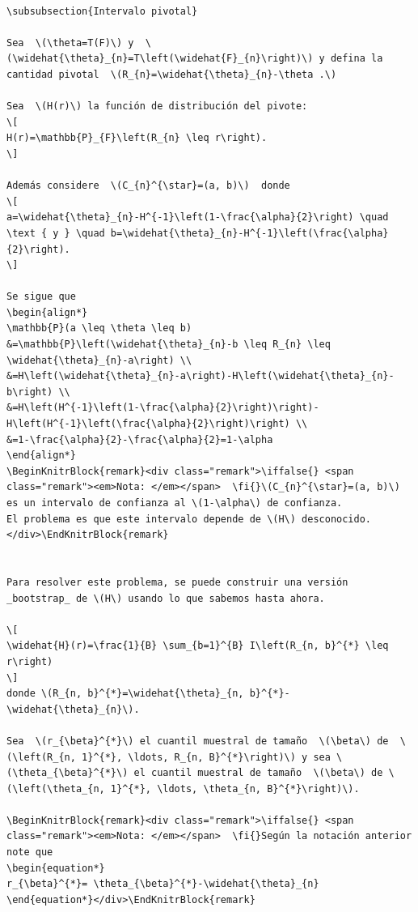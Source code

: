 \documentclass[
  12pt,
]{book}
\theoremstyle{definition}
\theoremstyle{definition}
\theoremstyle{definition}
\theoremstyle{remark}
\let\BeginKnitrBlock\begin \let\EndKnitrBlock\end
\begin{document}
\begin{verbatim}

\subsubsection{Intervalo pivotal}

Sea  \(\theta=T(F)\) y  \(\widehat{\theta}_{n}=T\left(\widehat{F}_{n}\right)\) y defina la cantidad pivotal  \(R_{n}=\widehat{\theta}_{n}-\theta .\)

Sea  \(H(r)\) la función de distribución del pivote:
\[
H(r)=\mathbb{P}_{F}\left(R_{n} \leq r\right).
\]

Además considere  \(C_{n}^{\star}=(a, b)\)  donde
\[
a=\widehat{\theta}_{n}-H^{-1}\left(1-\frac{\alpha}{2}\right) \quad \text { y } \quad b=\widehat{\theta}_{n}-H^{-1}\left(\frac{\alpha}{2}\right).
\]

Se sigue que
\begin{align*}
\mathbb{P}(a \leq \theta \leq b)
&=\mathbb{P}\left(\widehat{\theta}_{n}-b \leq R_{n} \leq \widehat{\theta}_{n}-a\right) \\
&=H\left(\widehat{\theta}_{n}-a\right)-H\left(\widehat{\theta}_{n}-b\right) \\
&=H\left(H^{-1}\left(1-\frac{\alpha}{2}\right)\right)-H\left(H^{-1}\left(\frac{\alpha}{2}\right)\right) \\
&=1-\frac{\alpha}{2}-\frac{\alpha}{2}=1-\alpha
\end{align*}
\BeginKnitrBlock{remark}<div class="remark">\iffalse{} <span class="remark"><em>Nota: </em></span>  \fi{}\(C_{n}^{\star}=(a, b)\)  es un intervalo de confianza al \(1-\alpha\) de confianza.
El problema es que este intervalo depende de \(H\) desconocido.
</div>\EndKnitrBlock{remark}


Para resolver este problema, se puede construir una versión _bootstrap_ de \(H\) usando lo que sabemos hasta ahora.

\[
\widehat{H}(r)=\frac{1}{B} \sum_{b=1}^{B} I\left(R_{n, b}^{*} \leq r\right)
\]
donde \(R_{n, b}^{*}=\widehat{\theta}_{n, b}^{*}-\widehat{\theta}_{n}\).

Sea  \(r_{\beta}^{*}\) el cuantil muestral de tamaño  \(\beta\) de  \(\left(R_{n, 1}^{*}, \ldots, R_{n, B}^{*}\right)\) y sea \(\theta_{\beta}^{*}\) el cuantil muestral de tamaño  \(\beta\) de \(\left(\theta_{n, 1}^{*}, \ldots, \theta_{n, B}^{*}\right)\).

\BeginKnitrBlock{remark}<div class="remark">\iffalse{} <span class="remark"><em>Nota: </em></span>  \fi{}Según la notación anterior note que
\begin{equation*}
r_{\beta}^{*}= \theta_{\beta}^{*}-\widehat{\theta}_{n}
\end{equation*}</div>\EndKnitrBlock{remark}




\end{verbatim}
\end{document}
